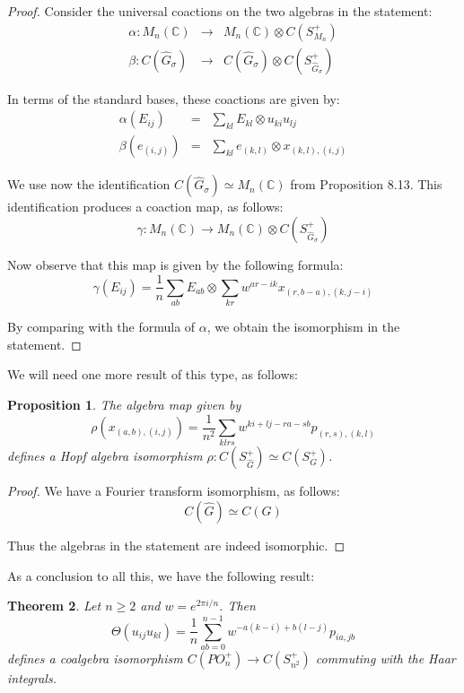 \documentclass[12pt]{amsbook}
\newtheorem{theorem}{Theorem}[chapter]
\newtheorem{proposition}[theorem]{Proposition}
\begin{document}
\begin{proof}
Consider the universal coactions on the two algebras in the statement:
\begin{eqnarray*}
\alpha:M_n(\mathbb C)&\to&M_n({\mathbb C})\otimes C(S_{M_n}^+)\\
\beta:C(\widehat{G}_\sigma)&\to&C(\widehat{G}_\sigma)\otimes C(S_{\widehat{G}_\sigma}^+)
 \end{eqnarray*}
 
In terms of the standard bases, these coactions are given by:
\begin{eqnarray*}
\alpha(E_{ij})&=&\sum_{kl}E_{kl}\otimes u_{ki}u_{lj}\\
\beta(e_{(i,j)})&=&\sum_{kl} e_{(k,l)}\otimes x_{(k,l),(i,j)}
\end{eqnarray*}

We use now the identification $C(\widehat{G}_\sigma)\simeq M_n(\mathbb C)$ from Proposition 8.13. This identification produces a coaction map, as follows:
$$\gamma:M_n(\mathbb C)\to M_n(\mathbb C)\otimes C(S_{\widehat{G}_\sigma}^+)$$

Now observe that this map is given by the following formula:
 $$\gamma(E_{ij})=\frac{1}{n}\sum_{ab}E_{ab}\otimes\sum_{kr}w^{ar-ik} x_{(r,b-a),(k,j-i)}$$

By comparing with the formula of $\alpha$, we obtain the isomorphism in the statement.
\end{proof}

We will need one more result of this type, as follows:

\begin{proposition}
The algebra map given by
$$\rho(x_{(a,b),(i,j)})=\frac{1}{n^2}\sum_{klrs}w^{ki+lj-ra-sb}p_{(r,s),(k,l)}$$
defines a Hopf algebra isomorphism $\rho:C(S_{\widehat{G}}^+)\simeq C(S_G^+)$.
\end{proposition}

\begin{proof}
We have a Fourier transform isomorphism, as follows:
$$C(\widehat{G})\simeq C(G)$$

Thus the algebras in the statement are indeed isomorphic.
\end{proof}

As a conclusion to all this, we have the following result:

\begin{theorem}
Let $n\geq 2$ and $w=e^{2\pi i/n}$. Then
$$\Theta(u_{ij}u_{kl})=\frac{1}{n}\sum_{ab=0}^{n-1}w^{-a(k-i)+b(l-j)}p_{ia,jb}$$
defines a coalgebra isomorphism $C(PO_n^+)\to C(S_{n^2}^+)$ commuting with the Haar integrals.
\end{theorem}
 
\end{document}
